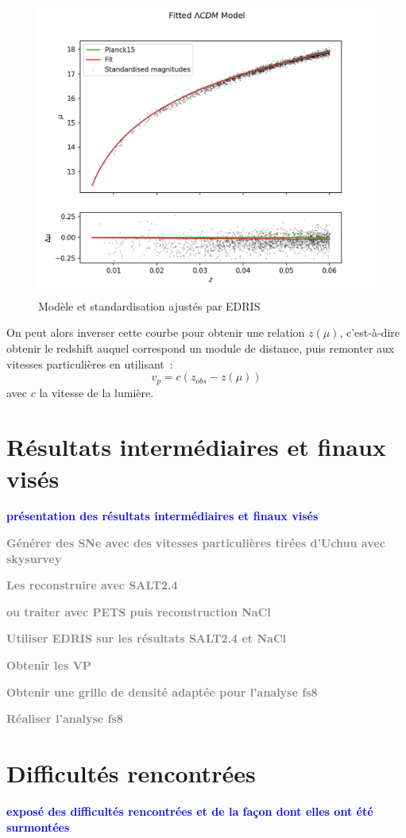 \documentclass{book}
\newcommand{\todo}[1]{{\textcolor{gray}{\bf \large #1}}}
\newcommand{\consignes}[1]{{\textcolor{blue}{\bf \large #1}}}
\begin{document}
\begin{figure}
    \centering
    \includegraphics[width=0.8\linewidth]{figures/edris_model_fit.png}
    \caption{Modèle et standardisation ajustés par EDRIS}
    \label{fig:edris_fit}
\end{figure}

On peut alors inverser cette courbe pour obtenir une relation $z(\mu)$, c'est-à-dire obtenir le redshift auquel correspond un module de distance, puis remonter aux vitesses particulières en utilisant~:
\begin{equation}
    v_p = c (z_{obs} - z(\mu))
\end{equation}
avec $c$ la vitesse de la lumière.

\section{Résultats intermédiaires et finaux visés}
\consignes{présentation des résultats intermédiaires et finaux visés}

\todo{Générer des SNe avec des vitesses particulières tirées d'Uchuu avec skysurvey}

\todo{Les reconstruire avec SALT2.4}

\todo{ou traiter avec PETS puis reconstruction NaCl}

\todo{Utiliser EDRIS sur les résultats SALT2.4 et NaCl}

\todo{Obtenir les VP}

\todo{Obtenir une grille de densité adaptée pour l'analyse fs8}

\todo{Réaliser l'analyse fs8}



\section{Difficultés rencontrées}
\consignes{exposé des difficultés rencontrées et de la façon dont elles ont été surmontées}
\end{document}
